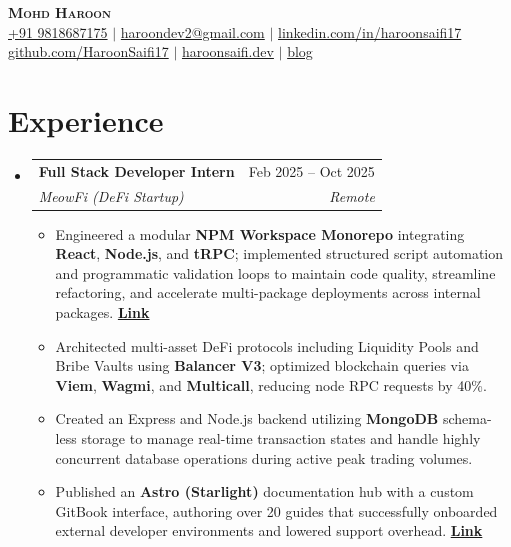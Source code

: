 \documentclass[letterpaper,11pt]{article}
\makeatletter
\newcommand{\resumeItem}[1]{
  \item\small{
    {#1 \vspace{-2pt}}
  }
}
\newcommand{\resumeSubheading}[4]{
  \vspace{-2pt}\item
    \begin{tabular*}{0.97\textwidth}[t]{l@{\extracolsep{\fill}}r}
      \textbf{#1} & #2 \\
      \textit{\small#3} & \textit{\small #4} \\
    \end{tabular*}\vspace{-7pt}
}
\newcommand{\resumeSubHeadingListStart}{\begin{itemize}[leftmargin=0.15in, label={}]}
\newcommand{\resumeSubHeadingListEnd}{\end{itemize}}
\newcommand{\resumeItemListStart}{\begin{itemize}}
\newcommand{\resumeItemListEnd}{\end{itemize}\vspace{-5pt}}
\makeatother
\begin{document}
\begin{center}
    \textbf{\Huge \scshape Mohd Haroon} \\ \vspace{3pt}
    \small \href{tel:+919818687175}{+91 9818687175} $|$
    \href{mailto:haroondev2@gmail.com}{haroondev2@gmail.com} $|$
    \href{https://linkedin.com/in/haroonsaifi17}{linkedin.com/in/haroonsaifi17} \\ \vspace{2pt}
    \href{https://github.com/HaroonSaifi17}{github.com/HaroonSaifi17} $|$
    \href{https://www.haroonsaifi.dev}{haroonsaifi.dev} $|$
    \href{https://www.haroonsaifi.dev/blog}{blog}
\end{center}

\vspace{-1.5em}

\section{Experience}
  \resumeSubHeadingListStart

    \resumeSubheading
      {Full Stack Developer Intern}{Feb 2025 -- Oct 2025}
      {MeowFi (DeFi Startup)}{Remote}
    \resumeItemListStart
        \resumeItem{Engineered a modular \textbf{NPM Workspace Monorepo} integrating \textbf{React}, \textbf{Node.js}, and \textbf{tRPC}; implemented structured script automation and programmatic validation loops to maintain code quality, streamline refactoring, and accelerate multi-package deployments across internal packages. \hfill \href{https://www.haroonsaifi.dev/case-studies/meowfi-dapp}{\textbf{Link}}}
        \resumeItem{Architected multi-asset DeFi protocols including Liquidity Pools and Bribe Vaults using \textbf{Balancer V3}; optimized blockchain queries via \textbf{Viem}, \textbf{Wagmi}, and \textbf{Multicall}, reducing node RPC requests by 40\%.}
        \resumeItem{Created an Express and Node.js backend utilizing \textbf{MongoDB} schema-less storage to manage real-time transaction states and handle highly concurrent database operations during active peak trading volumes.}
        \resumeItem{Published an \textbf{Astro (Starlight)} documentation hub with a custom GitBook interface, authoring over 20 guides that successfully onboarded external developer environments and lowered support overhead. \hfill \href{https://docs.meowfi.xyz}{\textbf{Link}}}
    \resumeItemListEnd

  \resumeSubHeadingListEnd
\end{document}
